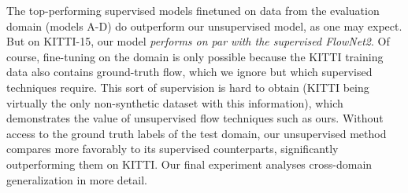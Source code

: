 \documentclass[runningheads]{llncs}
\begin{document}
The top-performing supervised models finetuned on data from the evaluation domain (models A-D) do outperform our unsupervised model, as one may expect. But on KITTI-15, our model \emph{performs on par with the supervised FlowNet2}. Of course, fine-tuning on the domain is only possible because the KITTI training data also contains ground-truth flow, which we ignore but which supervised techniques require. This sort of supervision is hard to obtain (KITTI being virtually the only non-synthetic dataset with this information), which demonstrates the value of unsupervised flow techniques such as ours. Without access to the ground truth labels of the test domain, our unsupervised method compares more favorably to its supervised counterparts, significantly outperforming them on KITTI. Our final experiment analyses cross-domain generalization in more detail.

\pagebreak
\end{document}
